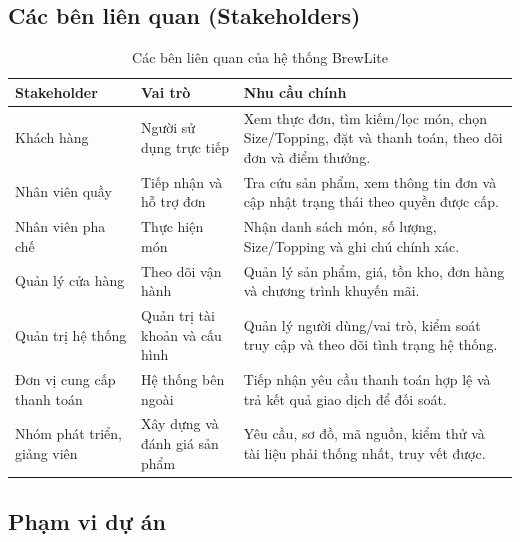 \subsection{Các bên liên quan (Stakeholders)}

\begin{table}[htbp]
\centering
\small
\caption{Các bên liên quan của hệ thống BrewLite}
\begin{tabular}{|p{}|p{}|p{}|}
\hline
\textbf{Stakeholder} & \textbf{Vai trò} & \textbf{Nhu cầu chính} \\
\hline
Khách hàng & Người sử dụng trực tiếp & Xem thực đơn, tìm kiếm/lọc món, chọn Size/Topping, đặt và thanh toán, theo dõi đơn và điểm thưởng. \\
\hline
Nhân viên quầy & Tiếp nhận và hỗ trợ đơn & Tra cứu sản phẩm, xem thông tin đơn và cập nhật trạng thái theo quyền được cấp. \\
\hline
Nhân viên pha chế & Thực hiện món & Nhận danh sách món, số lượng, Size/Topping và ghi chú chính xác. \\
\hline
Quản lý cửa hàng & Theo dõi vận hành & Quản lý sản phẩm, giá, tồn kho, đơn hàng và chương trình khuyến mãi. \\
\hline
Quản trị hệ thống & Quản trị tài khoản và cấu hình & Quản lý người dùng/vai trò, kiểm soát truy cập và theo dõi tình trạng hệ thống. \\
\hline
Đơn vị cung cấp thanh toán & Hệ thống bên ngoài & Tiếp nhận yêu cầu thanh toán hợp lệ và trả kết quả giao dịch để đối soát. \\
\hline
Nhóm phát triển, giảng viên & Xây dựng và đánh giá sản phẩm & Yêu cầu, sơ đồ, mã nguồn, kiểm thử và tài liệu phải thống nhất, truy vết được. \\
\hline
\end{tabular}
\end{table}

\subsection{Phạm vi dự án}

